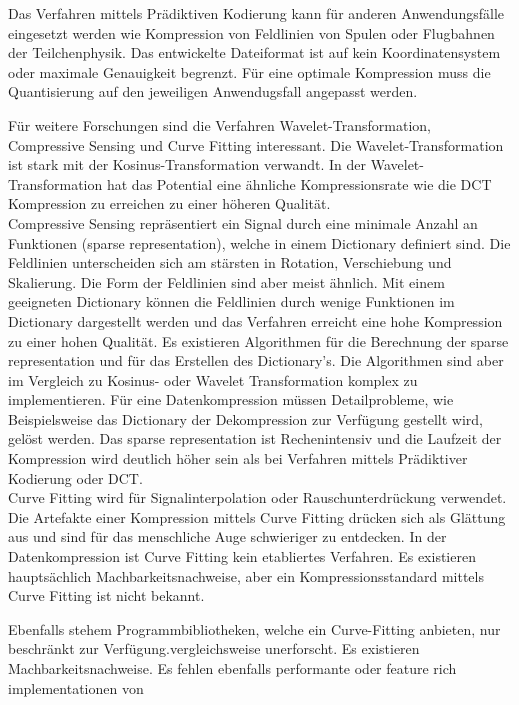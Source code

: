 Das Verfahren mittels Prädiktiven Kodierung kann für anderen Anwendungsfälle eingesetzt werden wie Kompression von Feldlinien von Spulen oder Flugbahnen der Teilchenphysik. Das entwickelte Dateiformat ist auf kein Koordinatensystem oder maximale Genauigkeit begrenzt. Für eine optimale Kompression muss die Quantisierung auf den jeweiligen Anwendugsfall angepasst werden.

Für weitere Forschungen sind die Verfahren Wavelet-Transformation, Compressive Sensing und Curve Fitting interessant. Die Wavelet-Transformation ist stark mit der Kosinus-Transformation verwandt. In der Wavelet-Transformation hat das Potential eine ähnliche Kompressionsrate wie die DCT Kompression zu erreichen zu einer höheren Qualität.\\
Compressive Sensing repräsentiert ein Signal durch eine minimale Anzahl an Funktionen (sparse representation), welche in einem Dictionary definiert sind. Die Feldlinien unterscheiden sich am stärsten in Rotation, Verschiebung und Skalierung. Die Form der Feldlinien sind aber meist ähnlich. Mit einem geeigneten Dictionary können die Feldlinien durch wenige Funktionen im Dictionary dargestellt werden und das Verfahren erreicht eine hohe Kompression zu einer hohen Qualität. Es existieren Algorithmen für die Berechnung der sparse representation und für das Erstellen des Dictionary's. Die Algorithmen sind aber im Vergleich zu Kosinus- oder Wavelet Transformation komplex zu implementieren. Für eine Datenkompression müssen Detailprobleme, wie Beispielsweise das Dictionary der Dekompression zur Verfügung gestellt wird, gelöst werden. Das sparse representation ist Rechenintensiv und die Laufzeit der Kompression wird deutlich höher sein als bei Verfahren mittels Prädiktiver Kodierung oder DCT.\\
Curve Fitting wird für Signalinterpolation oder Rauschunterdrückung verwendet. Die Artefakte einer Kompression mittels Curve Fitting drücken sich als Glättung aus und sind für das menschliche Auge schwieriger zu entdecken. In der Datenkompression ist Curve Fitting kein etabliertes Verfahren. Es existieren hauptsächlich Machbarkeitsnachweise, aber ein Kompressionsstandard mittels Curve Fitting ist nicht bekannt.

Ebenfalls stehem Programmbibliotheken, welche ein Curve-Fitting anbieten, nur beschränkt zur Verfügung.vergleichsweise unerforscht. Es existieren Machbarkeitsnachweise. Es fehlen ebenfalls performante oder feature rich implementationen von 

\pagebreak


